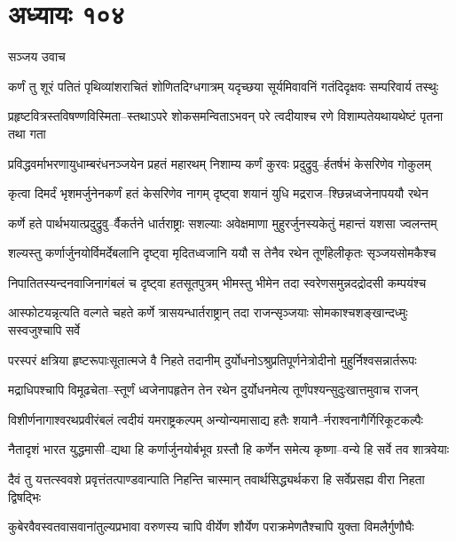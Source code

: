 \chapter{अध्यायः १०४}
\twolineshloka
{सञ्जय उवाच}
{}


\twolineshloka
{कर्णं तु शूरं पतितं पृथिव्यांशराचितं शोणितदिग्धगात्रम्}
{यदृच्छया सूर्यमिवावनिं गतंदिदृक्षवः सम्परिवार्य तस्थुः}


\twolineshloka
{प्रहृष्टवित्रस्तविषण्णविस्मिता--स्तथाऽपरे शोकसमन्विताऽभवन्}
{परे त्वदीयाश्च रणे विशाम्पतेयथायथेष्टं पृतना तथा गता}


\twolineshloka
{प्रविद्धवर्माभरणायुधाम्बरंधनञ्जयेन प्रहतं महारथम्}
{निशाम्य कर्णं कुरवः प्रदुद्रुवु--र्हतर्षभं केसरिणेव गोकुलम्}


\twolineshloka
{कृत्वा दिमर्दं भृशमर्जुनेनकर्णं हतं केसरिणेव नागम्}
{दृष्ट्वा शयानं युधि मद्रराज--श्छिन्नध्वजेनापययौ रथेन}


\twolineshloka
{कर्णे हते पार्थभयात्प्रदुद्रुवु--र्वैकर्तने धार्तराष्ट्राः सशल्याः}
{अवेक्षमाणा मुहुरर्जुनस्यकेतुं महान्तं यशसा ज्वलन्तम्}


\twolineshloka
{शल्यस्तु कर्णार्जुनयोर्विमर्देबलानि दृष्ट्वा मृदितध्वजानि}
{ययौ स तेनैव रथेन तूर्णंहेलीकृतः सृञ्जयसोमकैश्च}


\threelineshloka
{निपातितस्यन्दनवाजिनागंबलं च दृष्ट्वा हतसूतपुत्रम्}
{भीमस्तु भीमेन तदा स्वरेणसमुन्नदद्रोदसी कम्पयंश्च}
{}


\twolineshloka
{आस्फोटयन्नृत्यति वल्गते चहते कर्णे त्रासयन्धार्तराष्ट्रान्}
{तदा राजन्सृञ्जयाः सोमकाश्चशङ्खान्दध्मुः सस्वजुश्चापि सर्वे}


\twolineshloka
{परस्परं क्षत्रिया हृष्टरूपाःसूतात्मजे वै निहते तदानीम्}
{दुर्योधनोऽश्रुप्रतिपूर्णनेत्रोदीनो मुहुर्निश्वसन्नार्तरूपः}


\twolineshloka
{मद्राधिपश्चापि विमूढचेता--स्तूर्णं ध्वजेनापहृतेन तेन}
{रथेन दुर्योधनमेत्य तूर्णंपश्यन्सुदुःखात्तमुवाच राजन्}


\twolineshloka
{विशीर्णनागाश्वरथप्रवीरंबलं त्वदीयं यमराष्ट्रकल्पम्}
{अन्योन्यमासाद्य हतैः शयानै--र्नराश्वनागैर्गिरिकूटकल्पैः}


\twolineshloka
{नैतादृशं भारत युद्धमासी--द्यथा हि कर्णार्जुनयोर्बभूव}
{ग्रस्तौ हि कर्णेन समेत्य कृष्णा--वन्ये हि सर्वे तव शात्रवेयाः}


\twolineshloka
{दैवं तु यत्तत्स्ववशे प्रवृत्तंतत्पाण्डवान्पाति निहन्ति चास्मान्}
{तवार्थसिद्ध्यर्थकरा हि सर्वेप्रसह्य वीरा निहता द्विषद्भिः}


\twolineshloka
{कुबेरवैवस्वतवासवानांतुल्यप्रभावा वरुणस्य चापि}
{वीर्येण शौर्येण पराक्रमेणतैश्चापि युक्ता विमलैर्गुणौघैः}


